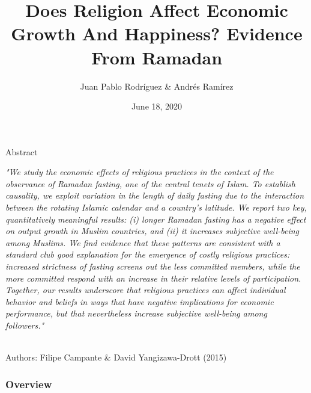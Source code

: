 \documentclass[pdftex,12pt,xcolor=pdftex,table]{beamer}
\title[Religion in Growth and Happiness]{Does Religion Affect Economic Growth And
Happiness? Evidence From Ramadan} %
\author{Juan Pablo Rodríguez \& Andrés Ramírez}
\institute[]{Summer School of Economics}
\date{June 18, 2020} %
\begin{document}
\begin{frame}
\titlepage
\end{frame}

\begin{frame}{Abstract}
\begin{footnotesize}

\textit{"We study the economic effects of religious practices in the context of the
observance of Ramadan fasting, one of the central tenets of Islam. To establish
causality, we exploit variation in the length of daily fasting due to the interaction
between the rotating Islamic calendar and a country’s latitude. We report
two key, quantitatively meaningful results: (i) longer Ramadan fasting has a
negative effect on output growth in Muslim countries, and (ii) it increases subjective
well-being among Muslims. We find evidence that these patterns are
consistent with a standard club good explanation for the emergence of costly
religious practices: increased strictness of fasting screens out the less committed
members, while the more committed respond with an increase in their
relative levels of participation. Together, our results underscore that religious
practices can affect individual behavior and beliefs in ways that have negative
implications for economic performance, but that nevertheless increase subjective
well-being among followers."}
\\\

Authors: Filipe Campante \& David Yangizawa-Drott (2015)
\end{footnotesize}
\end{frame}

\begin{frame}
\frametitle{Overview}
\tableofcontents 
\end{frame}
\end{document}
